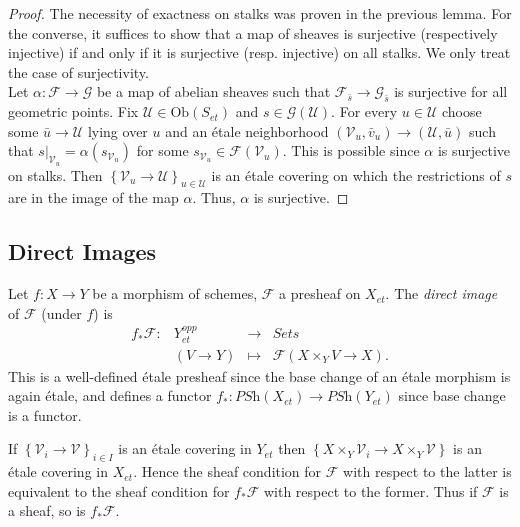 \begin{proof}
The necessity of exactness on stalks was proven in the previous lemma. For the converse, it suffices to show that a map of sheaves is surjective (respectively injective) if and only if it is surjective (resp. injective) on all stalks.  We only treat the case of surjectivity.
\\
Let $\alpha : \mathcal{F} \to \mathcal{G}$ be a map of abelian sheaves such that $\mathcal{F}_{\bar s} \to \mathcal{G}_{\bar s}$ is surjective for all geometric points.  Fix $\mathcal{U}\in \text{Ob}(S_{et})$ and $s \in \mathcal{G}(\mathcal{U})$. For every $u\in \mathcal{U}$ choose some $\bar u\to \mathcal{U}$ lying over $u$ and an \'etale neighborhood $(\mathcal{V}_u , \bar v_u)\to (\mathcal{U}, \bar u)$ such that $s|_{\mathcal{V}_u}=\alpha(s_{\mathcal{V}_{u}})$ for some $s_{\mathcal{V}_u}\in \mathcal{F}(\mathcal{V}_u)$. This is possible since $\alpha$ is surjective on stalks. Then $\left\{\mathcal{V}_u\to \mathcal{U}\right\}_{u\in \mathcal{U}}$ is an \'etale covering on which the restrictions of $s$ are in the image of the map $\alpha$.  Thus, $\alpha$ is surjective.
\end{proof}

\subsection{Direct Images}

\begin{definition}
Let $f: X\to Y$ be a morphism of schemes, $\mathcal{F} $ a presheaf on $X_{et}$. The \emph{direct image} of $\mathcal{F}$ (under $f$) is 
$$
\begin{array}{rrcl}
f_*\mathcal{F} : &Y_{et}^{opp} & \longrightarrow & \textit{Sets} \\
& \left(V\to Y\right) & \longmapsto & \mathcal{F}\left(X\times_Y V\to X\right).
\end{array}
$$
This is a well-defined \'etale presheaf since the base change of an \'etale morphism is again \'etale, and defines a functor $f_* : \textit{PSh}(X_{et}) \to \textit{PSh}(Y_{et})$ since base change is a functor. 
\end{definition}

\begin{remark}
If $\left\{\mathcal{V}_i\to \mathcal{V}\right\}_{i\in I}$ is an \'etale covering in $Y_{et}$ then $\left\{X\times_Y \mathcal{V}_i\to X\times_Y \mathcal{V}\right\}$ is an \'etale covering in $X_{et}$. Hence the sheaf condition for $\mathcal{F}$ with respect to the latter is equivalent to the sheaf condition for $f_*\mathcal{F}$ with respect to the former. Thus if $\mathcal{F}$ is a sheaf, so is $ f_*\mathcal{F}$. 
\end{remark}

